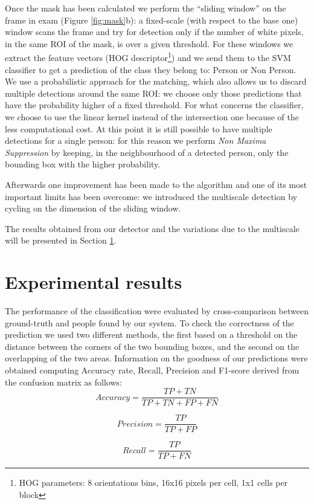 \documentclass[a4paper,letterpaper, 11pt, onecolumn]{article} %
\begin{document}
Once the mask has been calculated we perform the ``sliding window'' on the frame in exam (Figure \ref{fig:mask}b): a fixed-scale (with respect to the base one) window scans the frame and try for detection only if the number of white pixels, in the same ROI of the mask, is over a given threshold. For these windows we extract the feature vectors (HOG descriptor\footnote{HOG parameters: 8 orientations bins, 16x16 pixels per cell, 1x1 cells per block}) and we send them to the SVM classifier to get a prediction of the class they belong to: Person or Non Person. We use a probabilistic approach for the matching, which also allows us to discard multiple detections around the same ROI: we choose only those predictions that have the probability higher of a fixed threshold. For what concerns the classifier, we choose to use the linear kernel instead of the intersection one because of the less computational cost. At this point it is still possible to have multiple detections for a single person: for this reason we perform \emph{Non Maxima Suppression} by keeping, in the neighbourhood  of a detected person, only the bounding box with the higher probability.

Afterwards one improvement has been made to the algorithm and one of its most important limits has been overcome: we introduced the multiscale detection by cycling on the dimension of the sliding window. 

The results obtained from our detector and the variations due to the multiscale will be presented in Section \ref{results}.




\section{Experimental results}\label{results}
The performance of the classification were evaluated by cross-comparison between ground-truth and people found by our system. To check the correctness of the prediction we used two different methods, the first based on a threshold on the distance between the corners of the two bounding boxes, and the second on the overlapping of the two areas. Information on the goodness of our predictions were obtained computing Accuracy rate, Recall, Precision and F1-score derived from the confusion matrix as follows:
\\
$$Accuracy = \frac{TP + TN}{TP + TN + FP + FN}$$

$$Precision = \frac{TP}{TP + FP}$$

$$Recall = \frac{TP}{TP + FN}$$
\end{document}
